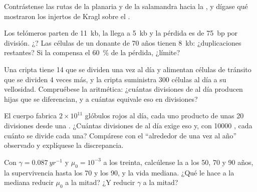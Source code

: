 \begin{exercise}[$\star$]\label{exo:b3:stem-cells:4}
Contrástense las rutas de la planaria y de la salamandra hacia la
, y dígase qué mostraron los injertos de Kragl sobre el
.
\end{exercise}

\begin{exercise}[$\star\star$]\label{exo:b3:stem-cells:5}
Los telómeros parten de \qty{11}{kb}, la  llega a
\qty{5}{kb} y la pérdida es de \qty{75}{bp} por división. ¿? Las células de un donante de 70 años tienen \qty{8}{kb}:
¿duplicaciones restantes? Si la  compensa el \qty{60}{\%} de
la pérdida, ¿límite?
\end{exercise}

\begin{exercise}[$\star\star$]\label{exo:b3:stem-cells:6}
Una cripta tiene 14  que se dividen una vez al día y
alimentan células de tránsito que se dividen 4 veces más, y la cripta
suministra \num{300} células al día a su vellosidad. Compruébese la
aritmética: ¿cuántas divisiones de  al día producen hijas
que se diferencian, y a cuántas  equivale eso en
divisiones?
\end{exercise}

\begin{exercise}[$\star\star$]\label{exo:b3:stem-cells:7}
El cuerpo fabrica $2\times 10^{11}$ glóbulos rojos al día, cada uno
producto de unas 20 divisiones desde una . ¿Cuántas
divisiones de  al día exige eso y, con \num{10000} , cada cuánto se divide cada una? Compárese con el ``alrededor de
una vez al año'' observado y explíquese la discrepancia.
\end{exercise}

\begin{exercise}[$\star\star$]\label{exo:b3:stem-cells:8}
Con $\gamma = \qty{0.087}{yr^{-1}}$ y $\mu_{0} = 10^{-3}$ a los treinta,
calcúlense la  a los 50, 70 y 90 años, la
supervivencia hasta los 70 y los 90, y la vida mediana. ¿Qué le hace a
la mediana reducir $\mu_{0}$ a la mitad? ¿Y reducir $\gamma$ a la mitad?
\end{exercise}

